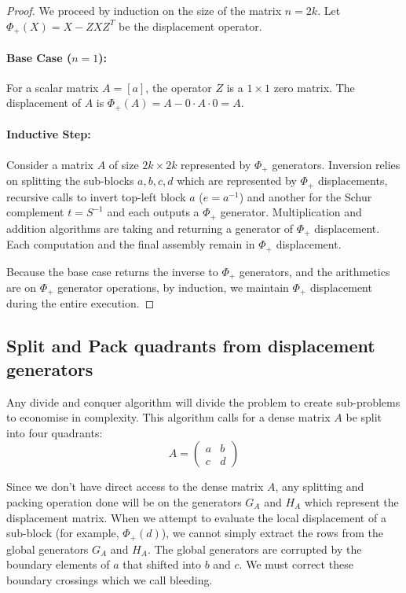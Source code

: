 \begin{proof}
  We proceed by induction on the size of the matrix $n = 2k$. Let
  $\Phi_+(X) = X - ZXZ^T$ be the displacement operator.

  \paragraph{Base Case ($n=1$):}
  For a scalar matrix $A = [a]$, the operator $Z$ is a $1 \times 1$ zero matrix.
  The displacement of $A$ is $\Phi_+(A) = A - 0 \cdot A \cdot 0 = A$.
  \paragraph{Inductive Step:}
  Consider a matrix $A$ of size $2k \times 2k$ represented by
  $\Phi_+$ generators.
  Inversion relies on splitting the sub-blocks $a, b, c, d$ which are
  represented by $\Phi_+$ displacements,
  recursive calls to invert top-left block $a$ ($e = a^{-1}$) and
  another for the Schur complement $t = S^{-1}$ and each outputs a
  $\Phi_+$ generator.
  Multiplication and addition algorithms are taking and returning a
  generator of $\Phi_+$ displacement.
  Each computation and the final assembly remain in $\Phi_+$ displacement.

  Because the base case returns the inverse to $\Phi_+$ generators,
  and the arithmetics are on $\Phi_+$ generator operations, by
  induction, we maintain $\Phi_+$ displacement during the entire execution.
\end{proof}

\subsection{Split and Pack quadrants from displacement generators}

Any divide and conquer algorithm will divide the problem to create
sub-problems to economise in complexity.
This algorithm calls for a dense matrix $A$ be split into four quadrants:
$$ A =
\begin{pmatrix} a & b \\ c & d
\end{pmatrix} $$

Since we don't have direct access to the dense matrix $A$,
any splitting and packing operation done will be on the generators
$G_A$ and $H_A$ which represent the displacement matrix.
When we attempt to evaluate the local displacement of a sub-block
(for example, $\Phi_+(d)$), we cannot simply extract the rows from
the global generators $G_A$ and $H_A$.
The global generators are corrupted by the boundary elements of $a$
that shifted into $b$ and $c$.
We must correct these boundary crossings which we call bleeding.

